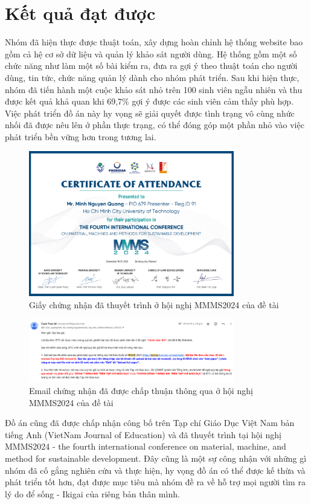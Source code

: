 \section{Kết quả đạt được}
    Nhóm đã hiện thực được thuật toán, xây dựng hoàn chỉnh hệ thống website bao gồm cả hệ cơ sở dữ liệu và quản lý khảo sát người dùng. Hệ thống gồm một số chức năng như làm một số bài kiểm ra, đưa ra gợi ý theo thuật toán cho người dùng, tin tức, chức năng quản lý dành cho nhóm phát triển. Sau khi hiện thực, nhóm đã tiến hành một cuộc khảo sát nhỏ trên 100 sinh viên ngẫu nhiên và thu được kết quả khả quan khi 69,7\% gợi ý được các sinh viên cảm thấy phù hợp. Việc phát triển đồ án này hy vọng sẽ giải quyết được tình trạng vô cùng nhức nhối đã được nêu lên ở phần thực trạng, có thể đóng góp một phần nhỏ vào việc phát triển bền vững hơn trong tương lai.
    
    \begin{figure}[H]
        \centering
        \includegraphics[width=0.8\textwidth]{images/chap1/present.png}
        \vspace{0.6cm}
        \caption{Giấy chứng nhận đã thuyết trình ở hội nghị MMMS2024 của đề tài}
    \end{figure}

    \begin{figure}[H]
        \centering
        \includegraphics[width=0.8\textwidth]{images/chap1/email.png}
        \vspace{0.6cm}
        \caption{Email chứng nhận đã được chấp thuận thông qua ở hội nghị MMMS2024 của đề tài}
    \end{figure}
    
    Đồ án cũng đã được chấp nhận công bố trên Tạp chí Giáo Dục Việt Nam bản tiếng Anh (VietNam Journal of Education) và đã thuyết trình tại hội nghị MMMS2024 - the fourth international conference on material, machine, and method for sustainable development. Đây cũng là một sự công nhận với những gì nhóm đã cố gắng nghiên cứu và thực hiện, hy vọng đồ án có thể được kế thừa và phát triển tốt hơn, đạt được mục tiêu mà nhóm đề ra về hỗ trợ mọi người tìm ra lý do để sống - Ikigai của riêng bản thân mình.